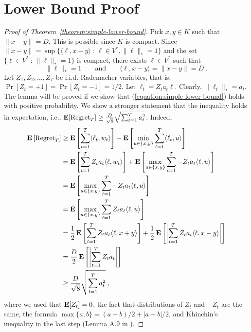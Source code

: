 \section{Lower Bound Proof}
\label{section:lower-bound-proof}

\begin{proof}[Proof of Theorem~\ref{theorem:simple-lower-bound}]
Pick $x,y \in K$ such that $\|x - y\| = D$. This is possible since $K$ is compact.
Since $\|x - y\| = \sup \{\langle \ell, x - y \rangle ~:~ \ell \in V^*, \|\ell\|_* = 1\}$
and the set $\{ \ell \in V^* ~:~ \|\ell\|_* = 1 \}$ is compact, there exists $\ell \in V^*$
such that
$$
\|\ell\|_* = 1 \qquad \text{and} \qquad \langle \ell, x - y \rangle = \|x - y\| = D \; .
$$
Let $Z_1, Z_2, \dots, Z_T$ be i.i.d. Rademacher variables, that is,
$\Pr[Z_t = +1] = \Pr[Z_t = -1] = 1/2$. Let $\ell_t = Z_t a_t \ell$.
Clearly, $\|\ell_t\|_* = a_t$. The lemma will be proved if we show that
(\ref{equation:simple-lower-bound}) holds with positive probability.
We show a stronger statement that the inequality holds in expectation, i.e.,
$\operatorname*{\mathbf{E}}[\operatorname{Regret}_T] \ge \frac{D}{\sqrt{8}} \sqrt{\sum_{t=1}^T a_t^2}$. Indeed,
\begin{align*}
\operatorname*{\mathbf{E}}\left[ \operatorname{Regret}_T \right]
& \ge \operatorname*{\mathbf{E}}\left[ \sum_{t=1}^T \langle \ell_t, w_t \rangle \right] - \operatorname*{\mathbf{E}}\left[\min_{u \in \{x,y\}} \sum_{t=1}^T \langle \ell_t, u \rangle \right] \\
& = \operatorname*{\mathbf{E}}\left[ \sum_{t=1}^T Z_t a_t \langle \ell, w_t \rangle \right] + \operatorname*{\mathbf{E}} \left[\max_{u \in \{x,y\}} \sum_{t=1}^T -Z_t a_t \langle \ell, u \rangle \right]  \\
& = \operatorname*{\mathbf{E}}\left[ \max_{u \in \{x,y\}} \sum_{t=1}^T -Z_t a_t \langle \ell, u \rangle \right] \\
& = \operatorname*{\mathbf{E}}\left[ \max_{u \in \{x,y\}} \sum_{t=1}^T Z_t a_t \langle \ell, u \rangle \right]  \\
& = \frac{1}{2} \operatorname*{\mathbf{E}}\left[ \sum_{t=1}^T Z_t a_t \langle \ell, x + y \rangle \right]  + \frac{1}{2}\operatorname*{\mathbf{E}}\left[ \left|\sum_{t=1}^T Z_t a_t \langle \ell, x - y \rangle \right| \right] \\
& = \frac{D}{2}\operatorname*{\mathbf{E}}\left[ \left|\sum_{t=1}^T Z_t a_t \right| \right] \\
& \ge \frac{D}{\sqrt{8}} \sqrt{\sum_{t=1}^T a_t^2} \; ,
\end{align*}
where we used that $\operatorname*{\mathbf{E}}[Z_t] = 0$, the fact that distributions of $Z_t$ and
$-Z_t$ are the same, the formula $\max\{a,b\} = (a+b)/2 + |a-b|/2$, and
Khinchin's inequality in the last step (Lemma A.9 in
\cite{Cesa-Bianchi-Lugosi-2006}).
\end{proof}
